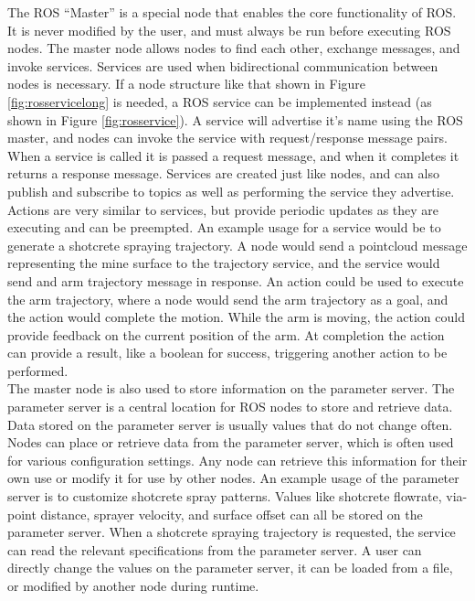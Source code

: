 The ROS ``Master'' is a special node that enables the core functionality of ROS. It is never modified by the user, and must always be run before executing ROS nodes. The master node allows nodes to find each other, exchange messages, and invoke services. Services are used when bidirectional communication between nodes is necessary. If a node structure like that shown in Figure \ref{fig:rosservicelong} is needed, a ROS service can be implemented instead (as shown in Figure \ref{fig:rosservice}). A service will advertise it's name using the ROS master, and nodes can invoke the service with request/response message pairs. When a service is called it is passed a request message, and when it completes it returns a response message. Services are created just like nodes, and can also publish and subscribe to topics as well as performing the service they advertise. Actions are very similar to services, but provide periodic updates as they are executing and can be preempted. An example usage for a service would be to generate a shotcrete spraying trajectory. A node would send a pointcloud message representing the mine surface to the trajectory service, and the service would send and arm trajectory message in response. An action could be used to execute the arm trajectory, where a node would send the arm trajectory as a goal, and the action would complete the motion. While the arm is moving, the action could provide feedback on the current position of the arm. At completion the action can provide a result, like a boolean for success, triggering another action to be performed.\\

The master node is also used to store information on the parameter server. The parameter server is a central location for ROS nodes to store and retrieve data. Data stored on the parameter server is usually values that do not change often. Nodes can place or retrieve data from the parameter server, which is often used for various configuration settings. Any node can retrieve this information for their own use or modify it for use by other nodes. An example usage of the parameter server is to customize shotcrete spray patterns. Values like shotcrete flowrate, via-point distance, sprayer velocity, and surface offset can all be stored on the parameter server. When a shotcrete spraying trajectory is requested, the service can read the relevant specifications from the parameter server. A user can directly change the values on the parameter server, it can be loaded from a file, or modified by another node during runtime.\\


